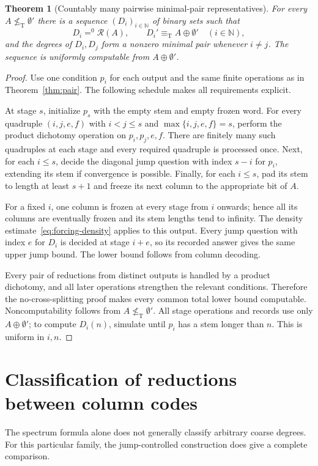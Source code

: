 \documentclass[11pt,a4paper]{article}
\newcommand{\N}{\mathbb N}
\newcommand{\eqT}{\equiv_{\mathrm T}}
\newcommand{\nleT}{\nleq_{\mathrm T}}
\newcommand{\az}{\mathrel{=^{0}}}
\newcommand{\R}{\mathcal R}
\newtheorem{theorem}{Theorem}[section]
\theoremstyle{definition}\newtheorem{definition}[theorem]{Definition}
\theoremstyle{remark}\newtheorem{remark}[theorem]{Remark}
\begin{document}
\begin{theorem}[Countably many pairwise minimal-pair representatives]\label{thm:countable}
For every $A\nleT\emptyset'$ there is a sequence $(D_i)_{i\in\N}$ of binary sets such that
\[
 D_i\az\R(A),\qquad D_i'\eqT A\oplus\emptyset'
 \quad(i\in\N),
\]
and the degrees of $D_i,D_j$ form a nonzero minimal pair whenever $i\ne j$. The sequence is uniformly computable from $A\oplus\emptyset'$.
\end{theorem}
\begin{proof}
Use one condition $p_i$ for each output and the same finite operations as in Theorem~\ref{thm:pair}. The following schedule makes all requirements explicit.

At stage $s$, initialize $p_s$ with the empty stem and empty frozen word. For every quadruple $(i,j,e,f)$ with $i<j\leq s$ and $\max\{i,j,e,f\}=s$, perform the product dichotomy operation on $p_i,p_j,e,f$. There are finitely many such quadruples at each stage and every required quadruple is processed once. Next, for each $i\leq s$, decide the diagonal jump question with index $s-i$ for $p_i$, extending its stem if convergence is possible. Finally, for each $i\leq s$, pad its stem to length at least $s+1$ and freeze its next column to the appropriate bit of $A$.

For a fixed $i$, one column is frozen at every stage from $i$ onwards; hence all its columns are eventually frozen and its stem lengths tend to infinity. The density estimate~\eqref{eq:forcing-density} applies to this output. Every jump question with index $e$ for $D_i$ is decided at stage $i+e$, so its recorded answer gives the same upper jump bound. The lower bound follows from column decoding.

Every pair of reductions from distinct outputs is handled by a product dichotomy, and all later operations strengthen the relevant conditions. Therefore the no-cross-splitting proof makes every common total lower bound computable. Noncomputability follows from $A\nleT\emptyset'$. All stage operations and records use only $A\oplus\emptyset'$; to compute $D_i(n)$, simulate until $p_i$ has a stem longer than $n$. This is uniform in $i,n$.
\end{proof}

\section{Classification of reductions between column codes}
\label{sec:order}
The spectrum formula alone does not generally classify arbitrary coarse degrees. For this particular family, the jump-controlled construction does give a complete comparison.
\end{document}
